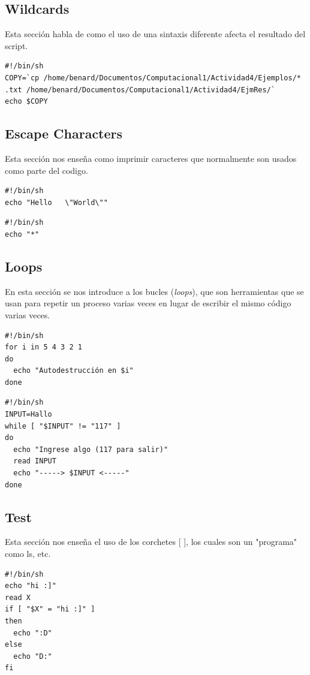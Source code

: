 \documentclass{article}
\begin{document}
\subsection{Wildcards}
Esta sección habla de como el uso de una sintaxis diferente afecta el resultado del script.

\begin{verbatim}
#!/bin/sh
COPY=`cp /home/benard/Documentos/Computacional1/Actividad4/Ejemplos/*
.txt /home/benard/Documentos/Computacional1/Actividad4/EjmRes/`
echo $COPY
\end{verbatim}

\subsection{Escape Characters}
Esta sección nos enseña como imprimir caracteres que normalmente son usados como parte del codigo.

\begin{verbatim}
#!/bin/sh
echo "Hello   \"World\""
\end{verbatim}

\begin{verbatim}
#!/bin/sh
echo "*"
\end{verbatim}

\subsection{Loops}
En esta sección se nos introduce a los bucles (\textit{loops}), que son herramientas que se usan para repetir un proceso varias veces en lugar de escribir el mismo código varias veces.

\begin{verbatim}
#!/bin/sh
for i in 5 4 3 2 1
do
  echo "Autodestrucción en $i"
done
\end{verbatim}

\begin{verbatim}
#!/bin/sh
INPUT=Hallo
while [ "$INPUT" != "117" ]
do
  echo "Ingrese algo (117 para salir)"
  read INPUT
  echo "-----> $INPUT <-----"
done
\end{verbatim}

\subsection{Test}
Esta sección nos enseña el uso de los corchetes [ ], los cuales son un "programa" como ls, etc.

\begin{verbatim}
#!/bin/sh
echo "hi :]"
read X
if [ "$X" = "hi :]" ]
then
  echo ":D"
else
  echo "D:"
fi
\end{verbatim}
\end{document}

